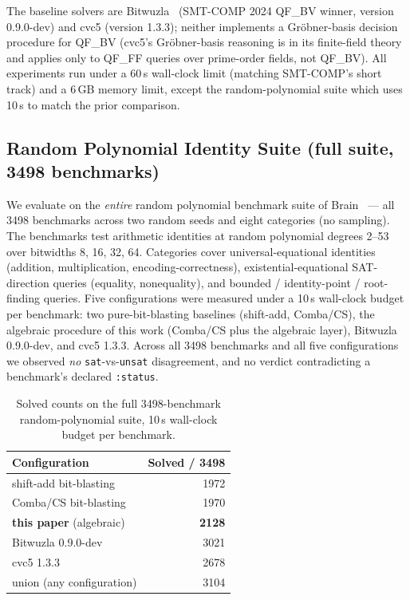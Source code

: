 \documentclass[runningheads]{llncs}
\begin{document}
The baseline solvers are Bitwuzla~\cite{niemetz2023bitwuzla}
(SMT-COMP 2024 QF\_BV winner, version 0.9.0-dev) and cvc5
(version 1.3.3); neither implements a Gr\"obner-basis decision
procedure for QF\_BV (cvc5's Gr\"obner-basis reasoning is in its
finite-field theory and applies only to QF\_FF queries over
prime-order fields, not QF\_BV). All experiments run under a
60\,s wall-clock limit (matching SMT-COMP's short track) and a
6\,GB memory limit, except the random-polynomial suite which uses
10\,s to match the prior comparison.

\subsection{Random Polynomial Identity Suite (full suite, 3498 benchmarks)}
\label{sec:eval-random-poly}

We evaluate on the \emph{entire} random polynomial benchmark
suite of Brain~\cite{brain2025subpoly} --- all 3498 benchmarks
across two random seeds and eight categories (no sampling). The
benchmarks test arithmetic identities at random polynomial
degrees 2--53 over bitwidths 8, 16, 32, 64.
Categories cover universal-equational identities (addition,
multiplication, encoding-correctness), existential-equational
SAT-direction queries (equality, nonequality), and bounded /
identity-point / root-finding queries. Five configurations
were measured under a 10\,s wall-clock budget per benchmark:
two pure-bit-blasting baselines (shift-add, Comba/CS), the
algebraic procedure of this work (Comba/CS plus the algebraic
layer), Bitwuzla 0.9.0-dev, and cvc5 1.3.3. Across all 3498
benchmarks and all five configurations we observed \emph{no}
\texttt{sat}-vs-\texttt{unsat} disagreement, and no verdict
contradicting a benchmark's declared \texttt{:status}.

\begin{table}[ht]
\caption{Solved counts on the full 3498-benchmark
random-polynomial suite, 10\,s wall-clock budget per benchmark.}
\label{tab:random-poly-solved}
\centering
\begin{tabular}{lr}
\toprule
Configuration                       & Solved / 3498 \\
\midrule
shift-add bit-blasting              & 1972 \\
Comba/CS bit-blasting               & 1970 \\
\textbf{this paper} (algebraic)     & \textbf{2128} \\
Bitwuzla 0.9.0-dev                  & 3021 \\
cvc5 1.3.3                          & 2678 \\
\midrule
union (any configuration)           & 3104 \\
\bottomrule
\end{tabular}
\end{table}
\end{document}
